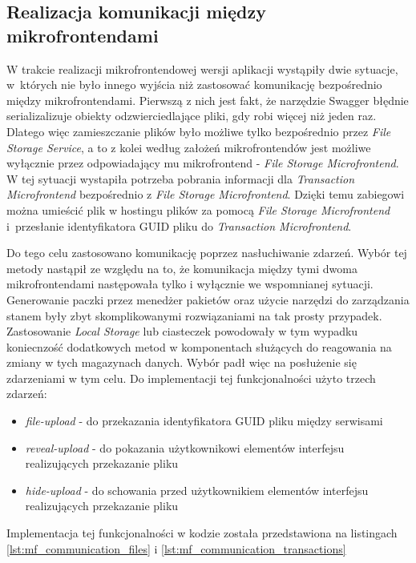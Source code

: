 \documentclass{SGGW-thesis}
\begin{document}
{  \subsection{Realizacja komunikacji między mikrofrontendami}
  W trakcie realizacji mikrofrontendowej wersji aplikacji wystąpiły dwie sytuacje, w~których nie było innego wyjścia niż zastosować komunikację bezpośrednio między mikrofrontendami.
  Pierwszą z nich jest fakt, że narzędzie Swagger błędnie serializalizuje obiekty odzwierciedlające pliki, gdy robi więcej niż jeden raz. Dlatego więc zamieszczanie plików było możliwe tylko bezpośrednio przez \textit{File Storage Service}, a to z kolei według założeń mikrofrontendów jest możliwe wyłącznie przez odpowiadający mu mikrofrontend - \textit{File Storage Microfrontend}. W tej sytuacji wystapiła potrzeba pobrania informacji dla \textit{Transaction Microfrontend} bezpośrednio z \textit{File Storage Microfrontend}. Dzięki temu zabiegowi można umieścić plik w hostingu plików za pomocą \textit{File Storage Microfrontend} i~przesłanie identyfikatora GUID pliku do \textit{Transaction Microfrontend}.

  Do tego celu zastosowano komunikację poprzez nasłuchiwanie zdarzeń. Wybór tej metody nastąpił ze względu na to, że komunikacja między tymi dwoma mikrofrontendami następowała tylko i wyłącznie we wspomnianej sytuacji. Generowanie paczki przez menedżer pakietów oraz użycie narzędzi do zarządzania stanem były zbyt skomplikowanymi rozwiązaniami na tak prosty przypadek. Zastosowanie \textit{Local Storage} lub ciasteczek powodowały w tym wypadku koniecnzość dodatkowych metod w komponentach służących do reagowania na zmiany w tych magazynach danych. Wybór padł więc na posłużenie się zdarzeniami w tym celu. Do implementacji tej funkcjonalności użyto trzech zdarzeń:

  \begin{itemize}
    \item \textit{file-upload} - do przekazania identyfikatora GUID pliku między serwisami
    \item \textit{reveal-upload} - do pokazania użytkownikowi elementów interfejsu realizujących przekazanie pliku
    \item \textit{hide-upload} - do schowania przed użytkownikiem elementów interfejsu realizujących przekazanie pliku
  \end{itemize}

  Implementacja tej funkcjonalności w kodzie została przedstawiona na listingach \cref{lst:mf_communication_files} i \cref{lst:mf_communication_transactions}

}
\end{document}
